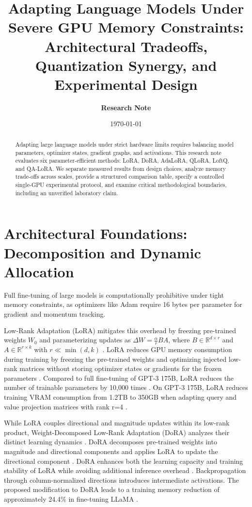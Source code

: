 \documentclass[11pt,a4paper]{article}
\title{\textbf{Adapting Language Models Under Severe GPU Memory Constraints:\\Architectural Tradeoffs, Quantization Synergy, and Experimental Design}}
\author{\textbf{Research Note}}
\date{\today}
\begin{document}
\sloppy

\maketitle

\begin{abstract}
Adapting large language models under strict hardware limits requires balancing model parameters, optimizer states, gradient graphs, and activations. This research note evaluates six parameter-efficient methods: LoRA, DoRA, AdaLoRA, QLoRA, LoftQ, and QA-LoRA. We separate measured results from design choices, analyze memory trade-offs across scales, provide a structured comparison table, specify a controlled single-GPU experimental protocol, and examine critical methodological boundaries, including an unverified laboratory claim.
\end{abstract}

\section{Architectural Foundations: Decomposition and Dynamic Allocation}

Full fine-tuning of large models is computationally prohibitive under tight memory constraints, as optimizers like Adam require 16 bytes per parameter for gradient and momentum tracking.

Low-Rank Adaptation (LoRA) mitigates this overhead by freezing pre-trained weights $W_0$ and parameterizing updates as $\Delta W = \frac{\alpha}{r} B A$, where $B \in \mathbb{R}^{d \times r}$ and $A \in \mathbb{R}^{r \times k}$ with $r \ll \min(d, k)$ \cite{hu2021lora}. LoRA reduces GPU memory consumption during training by freezing the pre-trained weights and optimizing injected low-rank matrices without storing optimizer states or gradients for the frozen parameters \cite{hu2021lora}. Compared to full fine-tuning of GPT-3 175B, LoRA reduces the number of trainable parameters by 10,000 times \cite{hu2021lora}. On GPT-3 175B, LoRA reduces training VRAM consumption from 1.2TB to 350GB when adapting query and value projection matrices with rank r=4 \cite{hu2021lora}.

While LoRA couples directional and magnitude updates within its low-rank product, Weight-Decomposed Low-Rank Adaptation (DoRA) analyzes their distinct learning dynamics \cite{liu2024dora}. DoRA decomposes pre-trained weights into magnitude and directional components and applies LoRA to update the directional component \cite{liu2024dora}. DoRA enhances both the learning capacity and training stability of LoRA while avoiding additional inference overhead \cite{liu2024dora}. Backpropagation through column-normalized directions introduces intermediate activations. The proposed modification to DoRA leads to a training memory reduction of approximately 24.4\% in fine-tuning LLaMA \cite{liu2024dora}.
\end{document}
